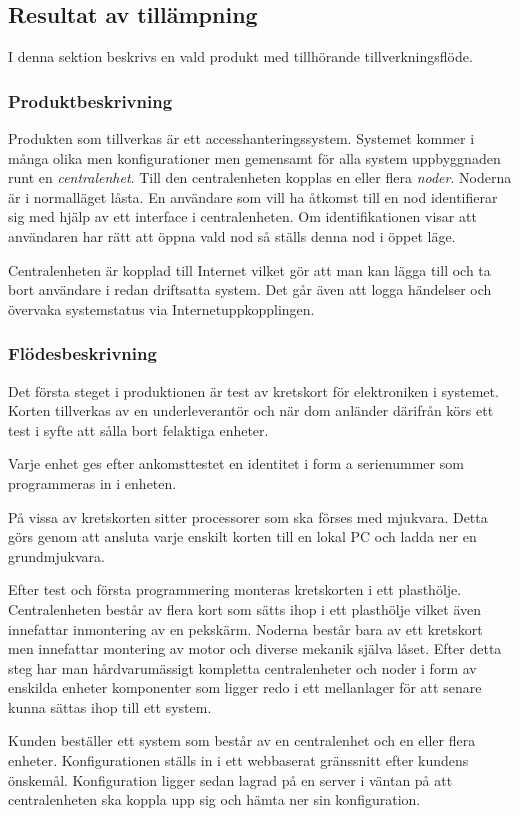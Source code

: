 \documentclass{article}
\begin{document}
\subsection*{Resultat av tillämpning}
I denna sektion beskrivs en vald produkt med tillhörande tillverkningsflöde.
\subsubsection*{Produktbeskrivning}
Produkten som tillverkas är ett accesshanteringssystem. Systemet kommer i många olika men konfigurationer men gemensamt för alla system uppbyggnaden runt en \emph{centralenhet}. Till den centralenheten kopplas en eller flera \emph{noder}. Noderna är i normalläget låsta. En användare som vill ha åtkomst till en nod identifierar sig med hjälp av ett interface i centralenheten. Om identifikationen visar att användaren har rätt att öppna vald nod så ställs denna nod i öppet läge.

Centralenheten är kopplad till Internet vilket gör att man kan lägga till och ta bort användare i redan driftsatta system. Det går även att logga händelser och övervaka systemstatus via Internetuppkopplingen.
     
\subsubsection*{Flödesbeskrivning}
Det första steget i produktionen är test av kretskort för elektroniken i systemet. Korten tillverkas av en underleverantör och när dom anländer därifrån körs ett test i syfte att sålla bort felaktiga enheter.

Varje enhet ges efter ankomsttestet en identitet i form a serienummer som programmeras in i enheten.

På vissa av kretskorten sitter processorer som ska förses med mjukvara. Detta görs genom att ansluta varje enskilt korten till en lokal PC och ladda ner en grundmjukvara. 
 
Efter test och första programmering monteras kretskorten i ett plasthölje. Centralenheten består av flera kort som sätts ihop i ett plasthölje vilket även innefattar inmontering av en pekskärm. Noderna består bara av ett kretskort men innefattar montering av motor och diverse mekanik själva låset. Efter detta steg har man hårdvarumässigt kompletta centralenheter och   noder i form av enskilda enheter komponenter som ligger redo i ett mellanlager för att senare kunna sättas ihop till ett system.

Kunden beställer ett system som består av en centralenhet och en eller flera enheter. Konfigurationen ställs in i ett webbaserat gränssnitt efter kundens önskemål. Konfiguration ligger sedan lagrad på en server i väntan på att centralenheten ska koppla upp sig och hämta ner sin konfiguration.
\end{document}
